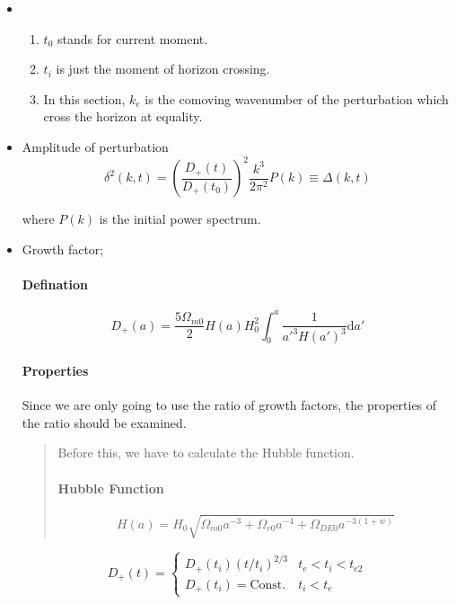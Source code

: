 \documentclass{article}
\begin{document}
\begin{itemize}

\item
\begin{enumerate}
\item
$t_0$ stands for current moment.
\item
$t_i$ is just the moment of horizon crossing.
\item
In this section, $k_e$ is the comoving wavenumber of the perturbation which cross the horizon at equality.

\end{enumerate}


\item
Amplitude of perturbation
\begin{equation}
\delta^2(k,t)=\left(\frac{D_+(t)}{D_+(t_0)}\right)^2\frac{k^3}{2\pi^2}P(k)\equiv  \Delta(k,t)
\end{equation}

where $P(k)$ is the initial power spectrum.

\item
Growth factor;

\paragraph{Defination}  \begin{equation}
D_+(a)=\frac{5\Omega_{m0}}{2}H(a)H_0^2\int_0^a \frac{1}{a'^3H(a')^3}\mathrm da'
\end{equation}

\paragraph{Properties}
Since we are only going to use the ratio of growth factors, the properties of the ratio should be examined.

\begin{quote}
Before this, we have to calculate the Hubble function.
\paragraph{Hubble Function}\begin{equation}
H(a)=H_0 \sqrt{\Omega_{m0}a^{-3}+\Omega_{r0}a^{-4}+\Omega_{DE0}a^{-3(1+w)}}
\end{equation}
\end{quote}

\begin{equation}
D_+(t)=
\begin{cases}
D_+(t_i)(t/t_i)^{2/3} & t_e<t_i<t_{e2} \\
D_+(t_i)=\text{Const.} & t_i<t_e
\end{cases}
\end{equation}




\end{itemize}
\end{document}
